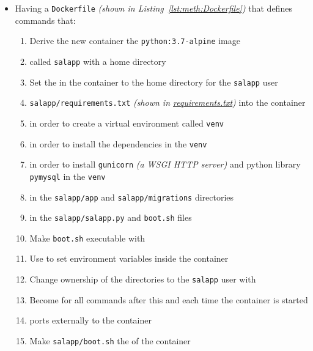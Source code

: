 \begin{enumerate}[leftmargin=0em,label=\protect\listlabelcircle{\arabic*}]
\begin{enumerate}[label=\Roman*~\textcolor{light-gray}{|}]
\begin{itemize}
          \item Having a \texttt{Dockerfile} \textit{(shown in Listing~\ref{lst:meth:Dockerfile})} that defines commands that:
            \begin{enumerate}[label=\textcolor{deep-gray}{\roman*\textasciitilde}]
              \item Derive the new container  the \texttt{python:3.7-alpine} image
              \item {} called \texttt{salapp} with a home directory
              \item Set the  in the container to the home directory for the \texttt{salapp} user
              \item {} \texttt{salapp/requirements.txt} \textit{(shown in \hyperref[fcl:salapp:requirements]{requirements.txt})} into the container
              \item {} in order to create a virtual environment called \texttt{venv}
              \item {} in order to install the dependencies in the \texttt{venv}
              \item {} in order to install \texttt{gunicorn} \textit{(a WSGI HTTP server)} and python library \texttt{pymysql} in the \texttt{venv}
              \item {} in the \texttt{salapp/app} and \texttt{salapp/migrations} directories
              \item {} in the \texttt{salapp/salapp.py} and \texttt{boot.sh} files
              \item Make \texttt{boot.sh} executable with 
              \item Use  to set environment variables inside the container
              \item Change ownership of the directories to the \texttt{salapp} user with 
              \item Become  for all commands after this and each time the container is started
              \item {} ports externally to the container
              \item Make \texttt{salapp/boot.sh} the  of the container

\end{enumerate}
\end{itemize}
\end{enumerate}
\end{enumerate}
